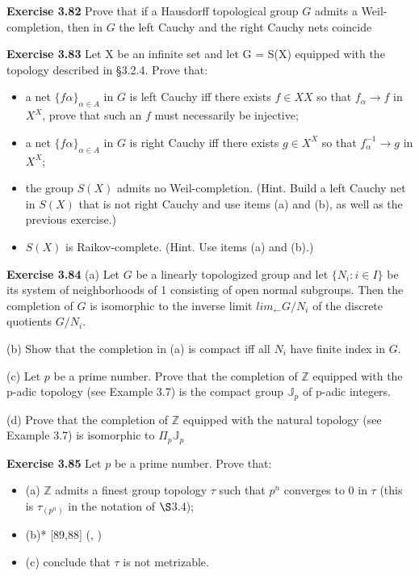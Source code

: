 \documentclass[12pt]{article}
\begin{document}
\textbf{Exercise 3.82} Prove that if a Hausdorff topological group $G$ admits a Weil-completion, then in $G$ the left
Cauchy and the right Cauchy nets coincide


\textbf{Exercise 3.83} Let X be an infinite set and let G = S(X) equipped with the topology described in §3.2.4. Prove
that:


\begin{itemize}

    \item a net  $\{f\alpha\}_{\alpha \in A}$ in $G$ is left Cauchy iff there exists $f \in XX$ so that $f_\alpha \to f$ in $X^X$, prove that such an $f$
    must necessarily be injective;
    
    \item  a net $\{f\alpha\}_{\alpha \in A}$ in $G$ is right Cauchy iff there exists $g \in X^X$ so that $f^{-1}_\alpha\to g$ in $X^X$;

    \item  the group $S(X)$ admits no Weil-completion. (Hint. Build a left Cauchy net in $S(X)$ that is not right
    Cauchy and use items (a) and (b), as well as the previous exercise.)

    \item $S(X)$ is Raikov-complete. (Hint. Use items (a) and (b).)
    

\end{itemize}


\textbf{Exercise 3.84} (a) Let $G$ be a linearly topologized group and let $\{N_i: i \in I\}$ be its system of neighborhoods
of 1 consisting of open normal subgroups. Then the completion of $G$ is isomorphic to the inverse limit
$lim_{\leftarrow} G/N_i$ of the discrete quotients $G/N_i$.


(b) Show that the completion in (a) is compact iff all $N_i$ have finite index in $G$.


(c) Let $p$ be a prime number. Prove that the completion of $\mathbb{Z}$ equipped with the p-adic topology (see Example
3.7) is the compact group $\mathbb{J}_p$ of p-adic integers.


(d) Prove that the completion of $\mathbb{Z}$ equipped with the natural topology (see Example 3.7) is isomorphic to
$\Pi_p \mathbb{J}_p$


\textbf{Exercise 3.85} Let $p$ be a prime number. Prove that:


    \begin{itemize}

        \item (a) $\mathbb{Z}$ admits a finest group topology $\tau$ such that $p^n$ converges to 0 in $\tau$ (this is $\tau_{(p^n)}$ in the notation of $\S$3.4);
    
        \item (b)* [89,88] (, \tau)
        
        \item (c) conclude that $\tau$ is not metrizable.
        
    \end{itemize}
\end{document}

